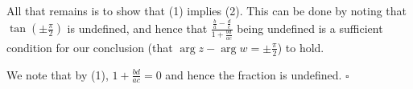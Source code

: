 \documentclass[a4paper]{article}
\begin{document}
All that remains is to show that (1) implies (2). This can be done by noting that $ \tan\left(\pm\frac{\pi}{2}\right) $
is undefined, and hence that $ \frac{\frac{b}{a} - \frac{d}{c}}{1 + \frac{bd}{ac}} $ being undefined is a sufficient
condition for our conclusion (that $ \arg z - \arg w = \pm \frac{\pi}{2} $) to hold.

We note that by (1), $ 1 + \frac{bd}{ac} = 0 $ and hence the fraction is undefined. $ \square $
\end{document}
